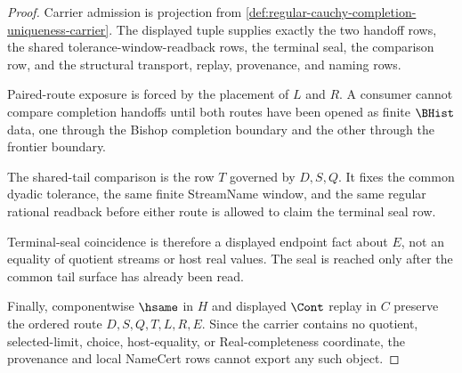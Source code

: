 \begin{proof}
Carrier admission is projection from \autoref{def:regular-cauchy-completion-uniqueness-carrier}. The displayed tuple supplies exactly the two handoff rows, the shared tolerance-window-readback rows, the terminal seal, the comparison row, and the structural transport, replay, provenance, and naming rows.

Paired-route exposure is forced by the placement of $L$ and $R$. A consumer cannot compare completion handoffs until both routes have been opened as finite $\BHist$ data, one through the Bishop completion boundary and the other through the frontier boundary.

The shared-tail comparison is the row $T$ governed by $D,S,Q$. It fixes the common dyadic tolerance, the same finite StreamName window, and the same regular rational readback before either route is allowed to claim the terminal seal row.

Terminal-seal coincidence is therefore a displayed endpoint fact about $E$, not an equality of quotient streams or host real values. The seal is reached only after the common tail surface has already been read.

Finally, componentwise $\hsame$ in $H$ and displayed $\Cont$ replay in $C$ preserve the ordered route $D,S,Q,T,L,R,E$. Since the carrier contains no quotient, selected-limit, choice, host-equality, or Real-completeness coordinate, the provenance and local NameCert rows cannot export any such object.
\end{proof}

\begin{closurestatus}{\RegularCauchyCompletionUniquenessUp}
  \theoryclosure{\seedClosure}
  \formalstatus{\theoremCheckedV}
\end{closurestatus}
